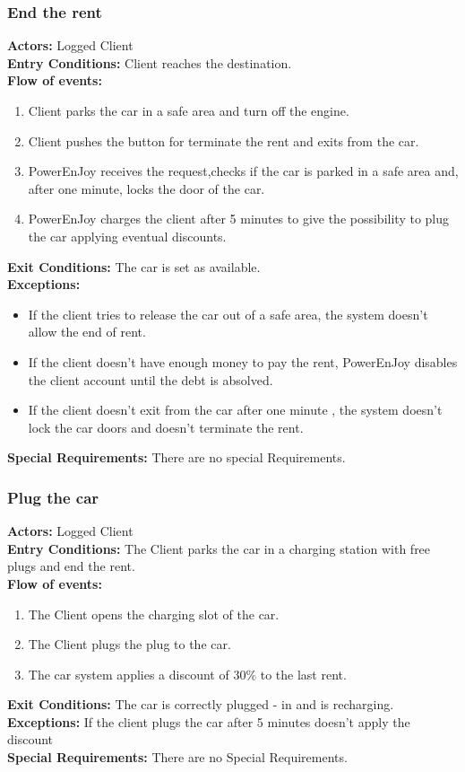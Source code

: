 \subsubsection{End the rent}
%
\textbf{Actors:}
Logged Client \\
%
\textbf{Entry Conditions:}
Client reaches the destination. \\
%
\textbf{Flow of events:}
\begin{enumerate}
\item Client parks the car in a safe area and turn off the engine.
\item Client pushes the button for terminate the rent and exits from the car.
\item PowerEnJoy receives the request,checks if the car is parked in a safe area and, after one minute, locks the door of the car.
\item PowerEnJoy charges the client after 5 minutes to give the possibility to plug the car applying eventual discounts.
\end{enumerate}
%
\textbf{Exit Conditions:}
The car is set as available. \\
%
\textbf{Exceptions:}
\begin{itemize}
\item If the client tries to release the car out of a safe area, the system doesn't allow the end of rent.
\item If the client doesn't have enough money to pay the rent, PowerEnJoy disables the client account until the debt is absolved.
\item If the client doesn't exit from the car after one minute , the system doesn't lock the car doors and doesn't terminate the rent.
\end{itemize}
%
\textbf{Special Requirements:}
There are no special Requirements.



\subsubsection{Plug the car}
%
\textbf{Actors:}
Logged Client \\
%
\textbf{Entry Conditions:}
The Client parks the car in a charging station with free plugs and end the rent. \\
%
\textbf{Flow of events:}
\begin{enumerate}
\item The Client opens the charging slot of the car.
\item The Client plugs the plug to the car.
\item The car system applies a discount of 30\% to the last rent.
\end{enumerate}
%
\textbf{Exit Conditions:}
The car is correctly plugged - in and is recharging.\\
%
\textbf{Exceptions:}
If the client plugs the car after 5 minutes doesn't apply the discount\\
%
\textbf{Special Requirements:}
There are no Special Requirements.



